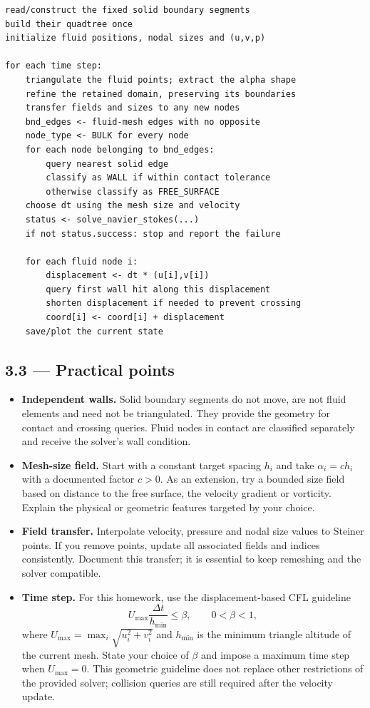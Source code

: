 \documentclass[11pt,a4paper]{article}
\begin{document}
\begin{lstlisting}[style=code,caption={PFEM driver},captionpos=b]
read/construct the fixed solid boundary segments
build their quadtree once
initialize fluid positions, nodal sizes and (u,v,p)

for each time step:
    triangulate the fluid points; extract the alpha shape
    refine the retained domain, preserving its boundaries
    transfer fields and sizes to any new nodes
    bnd_edges <- fluid-mesh edges with no opposite
    node_type <- BULK for every node
    for each node belonging to bnd_edges:
        query nearest solid edge
        classify as WALL if within contact tolerance
        otherwise classify as FREE_SURFACE
    choose dt using the mesh size and velocity
    status <- solve_navier_stokes(...)
    if not status.success: stop and report the failure

    for each fluid node i:
        displacement <- dt * (u[i],v[i])
        query first wall hit along this displacement
        shorten displacement if needed to prevent crossing
        coord[i] <- coord[i] + displacement
    save/plot the current state
\end{lstlisting}

\subsection*{3.3 --- Practical points}

\begin{itemize}[leftmargin=1.4em]
  \item \textbf{Independent walls.} Solid boundary segments do not move,
    are not fluid elements and need not be triangulated. They provide the
    geometry for contact and crossing queries. Fluid nodes in contact are
    classified separately and receive the solver's wall condition.
  \item \textbf{Mesh-size field.} Start with a constant target spacing
    $h_i$ and take $\alpha_i=c h_i$ with a documented factor $c>0$.
    As an extension, try a bounded size field based on distance to the free
    surface, the velocity gradient or vorticity. Explain the physical or
    geometric features targeted by your choice.
  \item \textbf{Field transfer.} Interpolate velocity, pressure and nodal
    size values to Steiner points. If you remove points, update all
    associated fields and indices consistently. Document this transfer;
    it is essential to keep remeshing and the solver compatible.
  \item \textbf{Time step.} For this homework, use the displacement-based
    CFL guideline
    \[
      U_{\max}\frac{\Delta t}{h_{\min}}\leq\beta,
      \qquad 0<\beta<1,
    \]
    where $U_{\max}=\max_i\sqrt{u_i^2+v_i^2}$ and $h_{\min}$ is the minimum
    triangle altitude of the current mesh. State your choice of $\beta$
    and impose a maximum time step when $U_{\max}=0$. This geometric
    guideline does not replace other restrictions of the provided solver;
    collision queries are still required after the velocity update.
\end{itemize}
\end{document}
